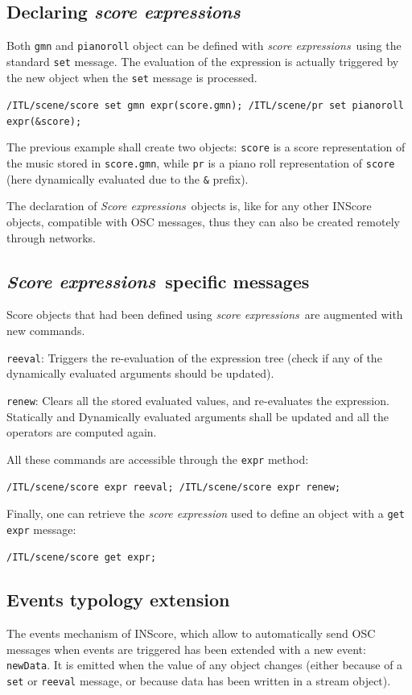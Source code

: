 \documentclass{article}
\newcommand{\OSC}[1]{\texttt{#1}}
\newcommand{\sExpr}{\emph{score expressions}}
\newcommand{\SExpr}{\emph{Score expressions}}
\let\olditemize\itemize
\let\oldenditemize\enditemize
\renewenvironment{itemize} 	{\olditemize \setlength{\itemsep}{1mm}}{\oldenditemize}
\newcommand{\sample}	[1]			{\vspace{-0.2em}\begin{center}\colorbox{mygrey}{\begin{minipage}[t]{0.95\columnwidth} {\small \texttt{#1}}\end{minipage}}\end{center}}
\begin{document}
\subsection{Declaring \sExpr}
\label{declaringExpr}
Both \OSC{gmn} and \OSC{pianoroll} object can be defined with \sExpr\ using the standard \OSC{set} message. The evaluation of the expression is actually triggered by the new object when the \OSC{set} message is processed.
\sample{/ITL/scene/score set gmn expr(score.gmn);
/ITL/scene/pr set pianoroll expr(\&score);
}

The previous example shall create two objects: \OSC{score} is a score representation of the music stored in \OSC{score.gmn}, while \OSC{pr} is a piano roll representation of \OSC{score} (here dynamically evaluated due to the \OSC{\&} prefix).

The declaration of \SExpr\ objects is, like for any other INScore objects, compatible with OSC messages, thus they can also be created remotely through networks. 

\subsection{\SExpr\ specific messages}
\label{exprMsgs}
Score objects that had been defined using \sExpr\ are augmented with new commands.

\begin{itemize}
\item \OSC{reeval}: Triggers the re-evaluation of the expression tree (check if any of the dynamically evaluated arguments should be updated).
\item \OSC{renew}: Clears all the stored evaluated values, and re-evaluates the expression. Statically and Dynamically evaluated arguments shall be updated and all the operators are computed again.
\end{itemize}

All these commands are accessible through the \OSC{expr} method:\sample{/ITL/scene/score expr reeval;
/ITL/scene/score expr renew;
}

Finally, one can retrieve the \emph{score expression} used to define an object with a \OSC{get expr} message:
\sample{/ITL/scene/score get expr;}

\subsection{Events typology extension}
\label{exprEvents}

The events mechanism of INScore, which allow to automatically send OSC messages when events are triggered \cite{Fober:13b} has  been extended with a new event: \OSC{newData}. It is emitted when the value of any object changes (either because of a \OSC{set} or \OSC{reeval} message, or because data has been written in a stream object).
\end{document}
